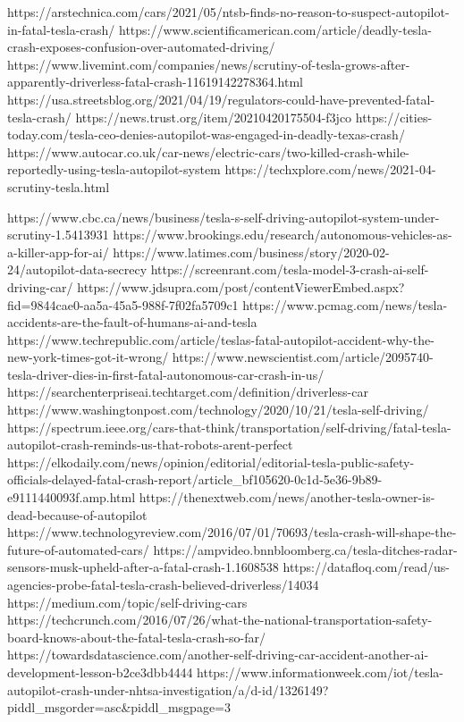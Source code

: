 https://arstechnica.com/cars/2021/05/ntsb-finds-no-reason-to-suspect-autopilot-in-fatal-tesla-crash/
https://www.scientificamerican.com/article/deadly-tesla-crash-exposes-confusion-over-automated-driving/
https://www.livemint.com/companies/news/scrutiny-of-tesla-grows-after-apparently-driverless-fatal-crash-11619142278364.html
https://usa.streetsblog.org/2021/04/19/regulators-could-have-prevented-fatal-tesla-crash/
https://news.trust.org/item/20210420175504-f3jco
https://cities-today.com/tesla-ceo-denies-autopilot-was-engaged-in-deadly-texas-crash/
https://www.autocar.co.uk/car-news/electric-cars/two-killed-crash-while-reportedly-using-tesla-autopilot-system
https://techxplore.com/news/2021-04-scrutiny-tesla.html

https://www.cbc.ca/news/business/tesla-s-self-driving-autopilot-system-under-scrutiny-1.5413931
https://www.brookings.edu/research/autonomous-vehicles-as-a-killer-app-for-ai/
https://www.latimes.com/business/story/2020-02-24/autopilot-data-secrecy
https://screenrant.com/tesla-model-3-crash-ai-self-driving-car/
https://www.jdsupra.com/post/contentViewerEmbed.aspx?fid=9844cae0-aa5a-45a5-988f-7f02fa5709c1
https://www.pcmag.com/news/tesla-accidents-are-the-fault-of-humans-ai-and-tesla
https://www.techrepublic.com/article/teslas-fatal-autopilot-accident-why-the-new-york-times-got-it-wrong/
https://www.newscientist.com/article/2095740-tesla-driver-dies-in-first-fatal-autonomous-car-crash-in-us/
https://searchenterpriseai.techtarget.com/definition/driverless-car
https://www.washingtonpost.com/technology/2020/10/21/tesla-self-driving/
https://spectrum.ieee.org/cars-that-think/transportation/self-driving/fatal-tesla-autopilot-crash-reminds-us-that-robots-arent-perfect
https://elkodaily.com/news/opinion/editorial/editorial-tesla-public-safety-officials-delayed-fatal-crash-report/article_bf105620-0c1d-5e36-9b89-e9111440093f.amp.html
https://thenextweb.com/news/another-tesla-owner-is-dead-because-of-autopilot
https://www.technologyreview.com/2016/07/01/70693/tesla-crash-will-shape-the-future-of-automated-cars/
https://ampvideo.bnnbloomberg.ca/tesla-ditches-radar-sensors-musk-upheld-after-a-fatal-crash-1.1608538
https://datafloq.com/read/us-agencies-probe-fatal-tesla-crash-believed-driverless/14034
https://medium.com/topic/self-driving-cars
https://techcrunch.com/2016/07/26/what-the-national-transportation-safety-board-knows-about-the-fatal-tesla-crash-so-far/
https://towardsdatascience.com/another-self-driving-car-accident-another-ai-development-lesson-b2ce3dbb4444
https://www.informationweek.com/iot/tesla-autopilot-crash-under-nhtsa-investigation/a/d-id/1326149?piddl_msgorder=asc&piddl_msgpage=3
